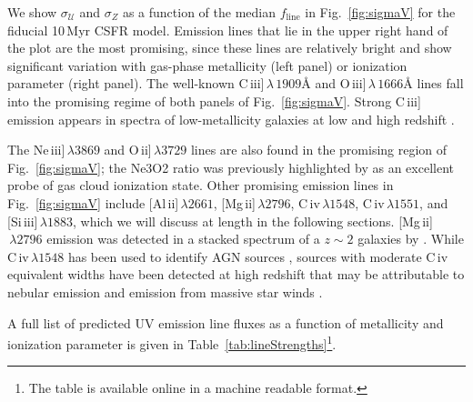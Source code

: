 \documentclass[preprint2,trackchanges]{aastex62}
\newcommand{\civ}{C\,{\sc iv}\xspace}
\newcommand{\ciii}{C\,{\sc iii}]\xspace}
\newcommand{\sigmaU}{\ensuremath{\sigma_{\mathcal{U}}}\xspace}
\newcommand{\sigmaZ}{\ensuremath{\sigma_{Z}}\xspace}
\newcommand{\femline}{\ensuremath{f_{\mathrm{line}}}\xspace}
\newcommand{\Myr}{$\,$Myr\xspace}
\newcommand{\ang}{\ensuremath{\mbox{\AA}}\xspace}
\begin{document}

We show \sigmaU and \sigmaZ as a function of the median \femline in Fig.~\ref{fig:sigmaV} for the fiducial 10\Myr CSFR model. Emission lines that lie in the upper right hand of the plot are the most promising, since these lines are relatively bright and show significant variation with gas-phase metallicity (left panel) or ionization parameter (right panel). The well-known C{\sc \,iii}]$\,\lambda\,1909$\ang and O{\sc \,iii}]$\,\lambda\,1666$\ang lines fall into the promising regime of both panels of Fig.~\ref{fig:sigmaV}. Strong \ciii emission appears in spectra of low-metallicity galaxies at low and high redshift \citep[e.g.,][]{Shapley+2003, Erb+2010, Leitherer+2011, Bayliss+2014, Stark+2014, Stark+2015, Berg+2016, Senchyna+2017, Stroe+2017a}.

The Ne{\sc \,iii}]$\,\lambda3869$ and O{\sc \,ii}]$\,\lambda3729$ lines are also found in the promising region of Fig.~\ref{fig:sigmaV}; the Ne3O2 ratio was previously highlighted by \citet{Levesque+2014} as an excellent probe of gas cloud ionization state. Other promising emission lines in Fig.~\ref{fig:sigmaV} include [Al{\sc \,ii}]$\,\lambda2661$, [Mg{\sc \,ii}]$\,\lambda2796$, C{\sc \,iv}$\,\lambda1548$, C{\sc \,iv}$\,\lambda1551$, and [Si{\sc \,iii}]$\,\lambda1883$, which we will discuss at length in the following sections. [Mg{\sc \,ii}]$\,\lambda2796$ emission was detected in a stacked spectrum of a $z{\sim}2$ galaxies by \citet{Du+2016}. While C{\sc \,iv}$\,\lambda1548$ has been used to identify AGN sources \citep{Stroe+2017b, Feltre+2016}, sources with moderate \civ equivalent widths have been detected at high redshift that may be attributable to nebular emission and emission from massive star winds \citep{Stark+2014, Mainali+2017, Schmidt+2017}.

A full list of predicted UV emission line fluxes as a function of metallicity and ionization parameter is given in Table~\ref{tab:lineStrengths}\footnote{The table is available online in a machine readable format.}.
\end{document}
